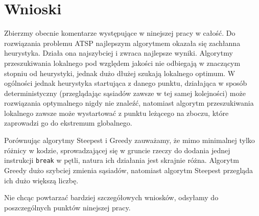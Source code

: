 \section{Wnioski}
Zbierzmy obecnie komentarze występujące w ninejszej pracy w całość. Do rozwiązania problemu ATSP najlepszym algorytmem okazała się zachłanna heurystyka. Działa ona najszybciej i zwraca najlepsze wyniki. Algorytmy przeszukiwania lokalnego pod względem jakości nie odbiegają w znaczącym stopniu od heurystyki, jednak dużo dłużej szukają lokalnego optimum. W ogólności jednak heurystyka startująca z danego punktu, działająca w sposób deterministyczny (przeglądając sąsiadów zawsze w tej samej kolejności) może rozwiązania optymalnego nigdy nie znaleźć, natomiast algorytm przeszukiwania lokalnego zawsze może wystartować z punktu leżącego na zboczu, które zaprowadzi go do ekstremum globalnego.

Porównując algorytmy Steepest i Greedy zauważamy, że mimo minimalnej tylko różnicy w kodzie, sprowadzającej się w gruncie rzeczy do dodania jednej instrukcji \texttt{break} w pętli, natura ich działania jest skrajnie różna. Algorytm Greedy dużo szybciej zmienia sąsiadów, natomiast algorytm Steepest przegląda ich dużo większą liczbę.

Nie chcąc powtarzać bardziej szczegółowych wniosków, odsyłamy do poszczególnych punktów ninejszej pracy.